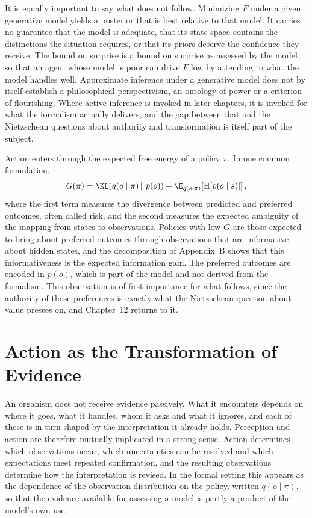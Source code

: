 It is equally important to say what does not follow. Minimizing $F$ under a given generative model yields a posterior that is best relative to that model. It carries no guarantee that the model is adequate, that its state space contains the distinctions the situation requires, or that its priors deserve the confidence they receive. The bound on surprise is a bound on surprise as assessed by the model, so that an agent whose model is poor can drive $F$ low by attending to what the model handles well. Approximate inference under a generative model does not by itself establish a philosophical perspectivism, an ontology of power or a criterion of flourishing. Where active inference is invoked in later chapters, it is invoked for what the formalism actually delivers, and the gap between that and the Nietzschean questions about authority and transformation is itself part of the subject.

Action enters through the expected free energy of a policy $\pi$. In one common formulation,
\[
G(\pi)
=
\KL\!\left(q(o\mid\pi)\,\|\,p(o)\right)
+
\E_{q(s\mid\pi)}\!\left[\mathrm{H}\!\left[p(o\mid s)\right]\right],
\]
where the first term measures the divergence between predicted and preferred outcomes, often called risk, and the second measures the expected ambiguity of the mapping from states to observations. Policies with low $G$ are those expected to bring about preferred outcomes through observations that are informative about hidden states, and the decomposition of Appendix~B shows that this informativeness is the expected information gain. The preferred outcomes are encoded in $p(o)$, which is part of the model and not derived from the formalism. This observation is of first importance for what follows, since the authority of those preferences is exactly what the Nietzschean question about value presses on, and Chapter~12 returns to it.

\chapter{Action as the Transformation of Evidence}

An organism does not receive evidence passively. What it encounters depends on where it goes, what it handles, whom it asks and what it ignores, and each of these is in turn shaped by the interpretation it already holds. Perception and action are therefore mutually implicated in a strong sense. Action determines which observations occur, which uncertainties can be resolved and which expectations meet repeated confirmation, and the resulting observations determine how the interpretation is revised. In the formal setting this appears as the dependence of the observation distribution on the policy, written $q(o\mid\pi)$, so that the evidence available for assessing a model is partly a product of the model's own use.

